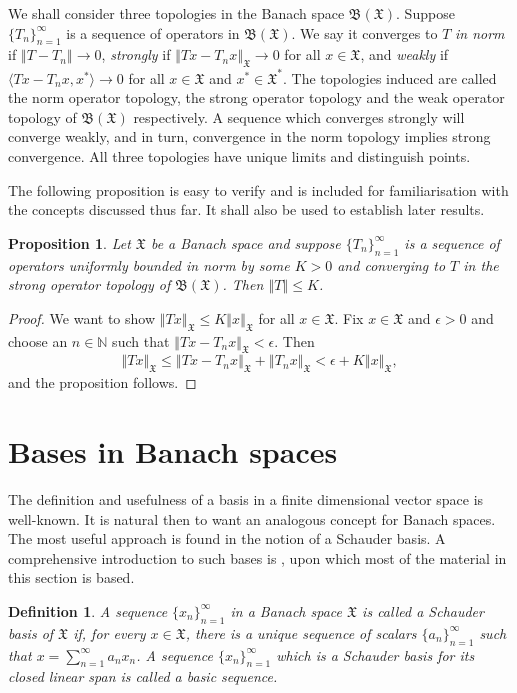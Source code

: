 \documentclass[12pt]{UNSWthesis}
\newcommand{\N}{\mathbb{N}}
\newcommand{\B}{\mathfrak{B}}
\newcommand{\X}{\mathfrak{X}}
\def\ip<#1,#2>{\langle #1,#2 \rangle}
\def\norm#1{\left \Vert #1 \right \Vert}
\newtheorem{proposition}[theorem]{Proposition}
\newtheorem{definition}[theorem]{Definition}
\numberwithin{equation}{section}
\begin{document}
We shall consider three topologies in the Banach space $\B(\X)$.
Suppose $\{T_n\}_{n=1}^{\infty}$ is a sequence of operators in $\B(\X)$.
We say it
converges to $T$ {\em in norm} if $\norm{T-T_n}\rightarrow 0$, {\em strongly} if
$\norm{Tx-T_nx}_{\X}\rightarrow 0$ for all $x\in\X$, and {\em weakly} if
$\ip<Tx-T_nx,x^*>\rightarrow 0$ for all $x\in\X$ and $x^*\in\X^*$. The 
topologies
induced are called the norm operator topology, the strong operator topology and
the weak
operator topology of $\B(\X)$ respectively. A sequence which converges strongly
will converge weakly, and in turn, convergence in the norm topology implies
strong convergence. All three topologies have unique limits and distinguish
points.

The following proposition is easy to verify and is included for familiarisation
with the concepts discussed thus far. It shall also be used to establish later
results.

\begin{proposition}\label{SOT convergence}
Let $\X$ be a Banach space and suppose $\{T_n\}_{n=1}^{\infty}$ is a sequence of
operators uniformly bounded in norm by some $K>0$ and converging to $T$
in the strong operator topology of $\B(\X)$. Then $\norm{T}\leq
K$.
\end{proposition}

\begin{proof}
We want to show $\norm{Tx}_{\X}\leq K\norm{x}_{\X}$ for all $x\in\X$. Fix
$x\in\X$ and $\epsilon>0$ and choose an $n\in\N$ such that
$\norm{Tx-T_nx}_{\X}<\epsilon$. Then 
\[\norm{Tx}_{\X}\leq\norm{Tx-T_nx}_{\X}+\norm{T_nx}_{\X}
<\epsilon+K\norm{x}_{\X},\]
and the proposition follows.
\end{proof}



\section{Bases in Banach spaces}\label{bases}


The definition and usefulness of a basis in a finite dimensional vector space is
well-known. It is natural then to want an analogous concept for
Banach spaces. The most useful approach is found in the notion of a Schauder
basis. A comprehensive introduction to such bases is \cite[pp. 1--52]{Lind},
upon which most of the material in this section is based. 

\begin{definition}
A sequence $\{x_n\}_{n=1}^{\infty}$ in a Banach space $\X$ is called a {\em 
Schauder basis of $\X$} if, for every $x\in\X$, there is a unique sequence of
scalars $\{a_n\}_{n=1}^{\infty}$ such that $x=\sum_{n=1}^{\infty}a_nx_n$. A
sequence $\{x_n\}_{n=1}^{\infty}$ which is a Schauder basis for its closed
linear span is called a {\em basic sequence}.
\end{definition}
\end{document}
